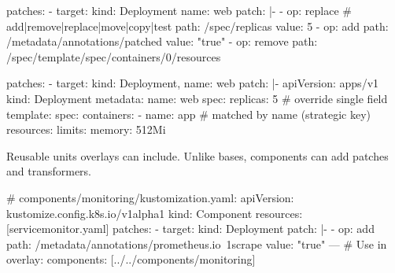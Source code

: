 \begin{tcbitemize}[
  raster columns=2, raster equal height=rows,
  blanker, cheat subtitle
]
    \begin{cheatcodebash}
    patches:
    - target:
        kind: Deployment
        name: web
      patch: |-
        - op: replace         # add|remove|replace|move|copy|test
          path: /spec/replicas
          value: 5
        - op: add
          path: /metadata/annotations/patched
          value: "true"
        - op: remove
          path: /spec/template/spec/containers/0/resources
    \end{cheatcodebash}
    \begin{cheatcodebash}
    patches:
    - target: {kind: Deployment, name: web}
      patch: |-
        apiVersion: apps/v1
        kind: Deployment
        metadata: {name: web}
        spec:
          replicas: 5         # override single field
          template:
            spec:
              containers:
              - name: app     # matched by name (strategic key)
                resources: {limits: {memory: 512Mi}}
    \end{cheatcodebash}

    {\fontsize{6.5}{7.5}\selectfont\sffamily
    Reusable units overlays can include. Unlike bases, components can add patches and transformers.}
    \begin{cheatcodebash}
    # components/monitoring/kustomization.yaml:
    apiVersion: kustomize.config.k8s.io/v1alpha1
    kind: Component
    resources: [servicemonitor.yaml]
    patches:
    - target: {kind: Deployment}
      patch: |-
        - op: add
          path: /metadata/annotations/prometheus.io~1scrape
          value: "true"
    ---
    # Use in overlay: components: [../../components/monitoring]
    \end{cheatcodebash}

\end{tcbitemize}
